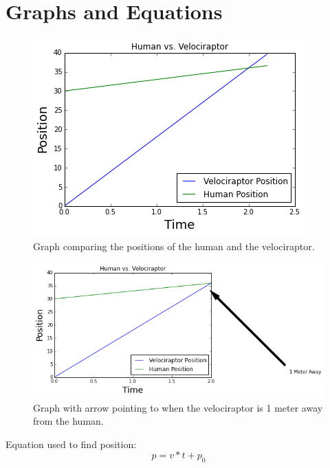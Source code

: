 \documentclass[twocolumn]{revtex4}
\begin{document}
\section{Graphs and Equations}
\begin{figure}[h!]
\includegraphics[width=\linewidth]{goodplot1.png}
\caption{Graph comparing the positions of the human and the velociraptor.}
\end{figure}
\begin{figure}[h!]
\includegraphics[width=\linewidth]{goodplot2.png}
\caption{Graph with arrow pointing to when the velociraptor is 1 meter away from the human.}
\end{figure}


Equation used to find position: $$p = v*t + p_0$$


\end{document}
